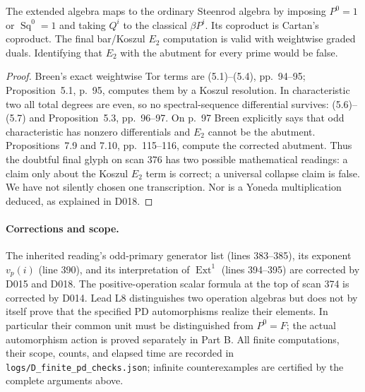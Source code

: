 \begin{proposition}\label{sa08:D021}
The extended algebra maps to the ordinary Steenrod algebra by
imposing $P^0=1$ or $\operatorname{Sq}^0=1$ and taking $Q^i$
to the classical $\beta P^i$. Its coproduct is Cartan's coproduct.
The final bar/Koszul $E_2$ computation is valid with weightwise
graded duals. Identifying that $E_2$ with the abutment for every
prime would be false.
\end{proposition}
\begin{proof}
Breen's exact weightwise Tor terms are (5.1)--(5.4), pp.~94--95;
Proposition~5.1, p.~95, computes them by a Koszul resolution.
In characteristic two all total degrees are even, so no
spectral-sequence differential survives: (5.6)--(5.7) and
Proposition~5.3, pp.~96--97. On p.~97 Breen explicitly says that
odd characteristic has nonzero differentials and $E_2$ cannot
be the abutment. Propositions~7.9 and 7.10, pp.~115--116,
compute the corrected abutment. Thus the doubtful final glyph
on scan 376 has two possible mathematical readings: a claim
only about the Koszul $E_2$ term is correct; a universal collapse
claim is false. We have not silently chosen one transcription.
Nor is a Yoneda multiplication deduced, as explained in D018.
\end{proof}

\paragraph{Corrections and scope.}
The inherited reading's odd-primary generator list (lines
383--385), its exponent $v_p(i)$ (line 390), and its interpretation
of $\operatorname{Ext}^1$ (lines 394--395) are corrected by D015
and D018. The positive-operation scalar formula at the top of
scan 374 is corrected by D014. Lead L8 distinguishes two operation
algebras but does not by itself prove that the specified
PD automorphisms realize their elements. In particular their
common unit must be distinguished from $P^0=F$; the actual
automorphism action is proved separately in Part B. All finite
computations, their scope, counts, and elapsed time are recorded
in \texttt{logs/D\_finite\_pd\_checks.json}; infinite counterexamples
are certified by the complete arguments above.

